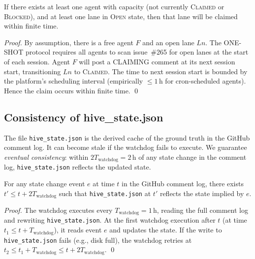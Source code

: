 \begin{proposition}
\label{prop:K-progress}
If there exists at least one agent with capacity (not currently
\textsc{Claimed} or \textsc{Blocked}), and at least one lane in
\textsc{Open} state, then that lane will be claimed within finite time.
\end{proposition}
\begin{proof}
By assumption, there is a free agent $F$ and an open lane $Ln$.
The ONE-SHOT protocol requires all agents to scan issue~\#265 for
open lanes at the start of each session. Agent $F$ will post a
CLAIMING comment at its next session start, transitioning $Ln$ to
\textsc{Claimed}. The time to next session start is bounded by the
platform's scheduling interval (empirically $\leq 1\,\text{h}$ for
cron-scheduled agents). Hence the claim occurs within finite time.
\qed
\end{proof}

\subsection{Consistency of hive\_state.json}
\label{ssec:K-consistency}

The file \texttt{hive\_state.json} is the derived cache of the
ground truth in the GitHub comment log. It can become stale if the
watchdog fails to execute. We guarantee \emph{eventual consistency}:
within $2 T_{\text{watchdog}} = 2\,\text{h}$ of any state change in
the comment log, \texttt{hive\_state.json} reflects the updated state.

\begin{proposition}
\label{prop:K-eventual-consistency}
For any state change event $e$ at time $t$ in the GitHub comment log,
there exists $t' \leq t + 2 T_{\text{watchdog}}$ such that
\texttt{hive\_state.json} at $t'$ reflects the state implied by $e$.
\end{proposition}
\begin{proof}
The watchdog executes every $T_{\text{watchdog}} = 1\,\text{h}$,
reading the full comment log and rewriting \texttt{hive\_state.json}.
At the first watchdog execution after $t$ (at time $t_1 \leq t + T_{\text{watchdog}}$),
it reads event $e$ and updates the state. If the write to
\texttt{hive\_state.json} fails (e.g., disk full), the watchdog retries
at $t_2 \leq t_1 + T_{\text{watchdog}} \leq t + 2 T_{\text{watchdog}}$.
\qed
\end{proof}


